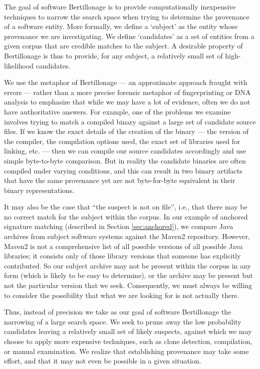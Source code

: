 \label{chapter:problem}

The goal of software Bertillonage is to provide computationally inexpensive
techniques to narrow the search space when trying to determine the
provenance of a software entity.  More formally, we define a `subject' as
the entity whose provenance we are investigating.  We define `candidates'
as a set of entities from a given corpus that are credible matches to the
subject.  A desirable property of Bertillonage is thus to provide, for any
subject, a relatively small set of high-likelihood candidates.

We use the metaphor of Bertillonage --- an approximate approach fraught
with errors --- rather than a more precise forensic metaphor of
fingerprinting or DNA analysis to emphasize that while we may have a lot of
evidence, often we do not have authoritative answers.  For example, one of
the problems we examine involves trying to match a compiled binary against
a large set of candidate source files. If we know the exact details of the
creation of the binary --- the version of the compiler, the compilation
options used, the exact set of libraries used for linking, etc. --- then we
can compile our source candidates accordingly and use simple byte-to-byte
comparison.  But in reality the candidate binaries are often compiled under
varying conditions, and this can result in two binary artifacts that have
the same provenance yet are not byte-for-byte equivalent in their binary
representations.

It may also be the case that ``the suspect is not on file'', i.e., that
there may be no correct match for the subject within the corpus.  In our
example of anchored signature matching
(described in Section \ref{sec:anchored}),
we compare Java
archives from subject software systems against the Maven2 repository.
However, Maven2 is not a comprehensive list of all possible versions of all
possible Java libraries; it consists only of those library versions that
someone has explicitly contributed.  So our subject archive may not be
present within the corpus in any form (which is likely to be easy to
determine), or the archive may be present but not the particular version
that we seek.  Consequently, we must always be willing to consider the
possibility that what we are looking for is not actually there.

Thus, instead of precision we take as our goal of software Bertillonage the
narrowing of a large search space.  We seek to prune away the low
probability candidates leaving a relatively small set of likely suspects,
against which we may choose to apply more expensive techniques, such as
clone detection, compilation, or manual examination.  We realize that
establishing provenance may take some effort, and that it may not even be
possible in a given situation.


